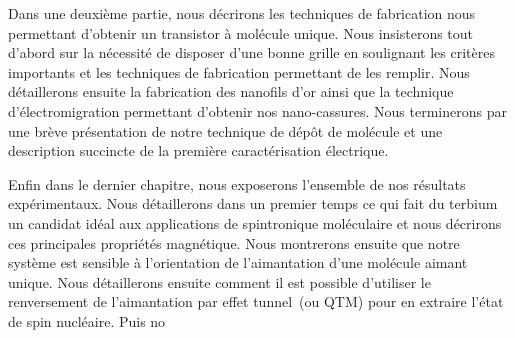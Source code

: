 Dans une deuxième partie, nous décrirons les techniques de fabrication nous permettant d'obtenir un transistor à molécule unique. Nous insisterons tout d'abord sur la nécessité de disposer d'une bonne grille en soulignant les critères importants et les techniques de fabrication permettant de les remplir. Nous détaillerons ensuite la fabrication des nanofils d'or ainsi que la technique d'électromigration permettant d'obtenir nos nano-cassures. Nous terminerons par une brève présentation de notre technique de dépôt de molécule et une description succincte de la première caractérisation électrique.

Enfin dans le dernier chapitre, nous exposerons l'ensemble de nos résultats expérimentaux. Nous détaillerons dans un premier temps ce qui fait du terbium un candidat idéal aux applications de spintronique moléculaire et nous décrirons ces principales propriétés magnétique. Nous montrerons ensuite que notre système est sensible à l'orientation de l'aimantation d'une molécule aimant unique. Nous détaillerons ensuite comment il est possible d'utiliser le renversement de l'aimantation par effet tunnel~(ou QTM) pour en extraire l'état de spin nucléaire. Puis no
